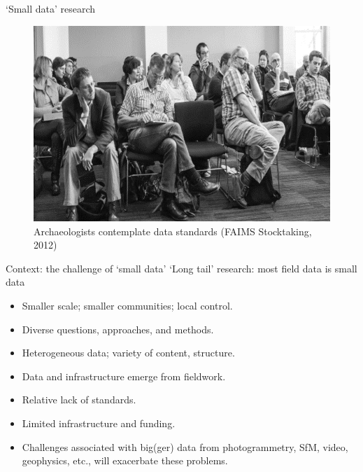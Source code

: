 \documentclass[aspectratio=169, 11pt]{beamer} %
\begin{document}
\begin{frame}{`Small data' research}
 \begin{figure}[H]
    \centering
        \includegraphics[height=.75\textheight]{figures/Archaeologists-standards.png}
        \caption{Archaeologists contemplate data standards (FAIMS Stocktaking, 2012)}
        \label{fig:figure7}
 \end{figure}
\end{frame}

\begin{frame}{Context: the challenge of `small data'}
    `Long tail' research: most field data is small data \cite{Borgman2015-rh}
    \begin{itemize}[label=\textbullet]
        \item Smaller scale; smaller communities; local control.
        \item Diverse questions, approaches, and methods.
        \item Heterogeneous data; variety of content, structure.
        \item Data and infrastructure emerge from fieldwork. 
        \item Relative lack of standards.
        \item Limited infrastructure and funding.
        \item Challenges associated with big(ger) data from photogrammetry, SfM, video, geophysics, etc., will exacerbate these problems.
    \end{itemize}
\end{frame}
\end{document}
